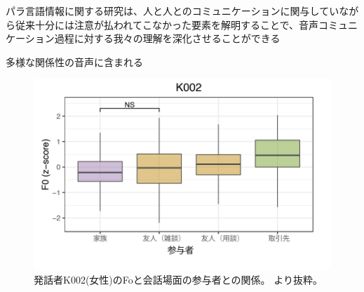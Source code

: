パラ言語情報に関する研究は、人と人とのコミュニケーションに関与していながら従来十分には注意が払われてこなかった要素を解明することで、音声コミュニケーション過程に対する我々の理解を深化させることができる\cite{maekawa_kitagawa}


多様な関係性の音声に含まれる

\begin{figure}[hbtp]
 \centering
   \includegraphics[width=12.0cm]{figures/ishimoto2.png}
 \caption[発話者K002(女性)のFoと会話場面の参与者との関係]{発話者K002(女性)のFoと会話場面の参与者との関係。 \cite{ishimoto}より抜粋。 }
 \label{ishimoto2:fig}
\end{figure}


